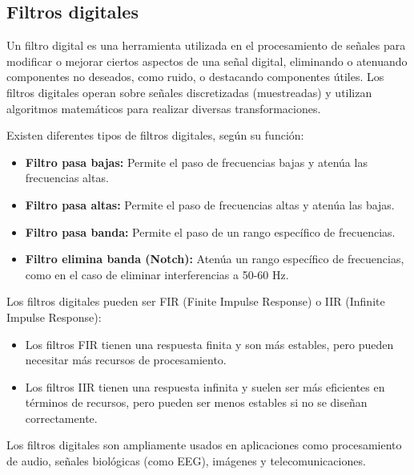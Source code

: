 \documentclass{article}
\begin{document}
\subsection{Filtros digitales}

Un filtro digital es una herramienta utilizada en el procesamiento de señales para modificar o mejorar ciertos aspectos de una señal digital, eliminando o atenuando componentes no deseados, como ruido, o destacando componentes útiles. Los filtros digitales operan sobre señales discretizadas (muestreadas) y utilizan algoritmos matemáticos para realizar diversas transformaciones.

Existen diferentes tipos de filtros digitales, según su función:

\begin{itemize}
    \item \textbf{Filtro pasa bajas:} Permite el paso de frecuencias bajas y atenúa las frecuencias altas.
    \item \textbf{Filtro pasa altas:} Permite el paso de frecuencias altas y atenúa las bajas.
    \item \textbf{Filtro pasa banda:} Permite el paso de un rango específico de frecuencias.
    \item \textbf{Filtro elimina banda (Notch):} Atenúa un rango específico de frecuencias, como en el caso de eliminar interferencias a 50-60 Hz.
\end{itemize}

Los filtros digitales pueden ser FIR (Finite Impulse Response) o IIR (Infinite Impulse Response):

\begin{itemize}
    \item Los filtros FIR tienen una respuesta finita y son más estables, pero pueden necesitar más recursos de procesamiento.
    \item Los filtros IIR tienen una respuesta infinita y suelen ser más eficientes en términos de recursos, pero pueden ser menos estables si no se diseñan correctamente.
\end{itemize}

Los filtros digitales son ampliamente usados en aplicaciones como procesamiento de audio, señales biológicas (como EEG), imágenes y telecomunicaciones.
\end{document}
